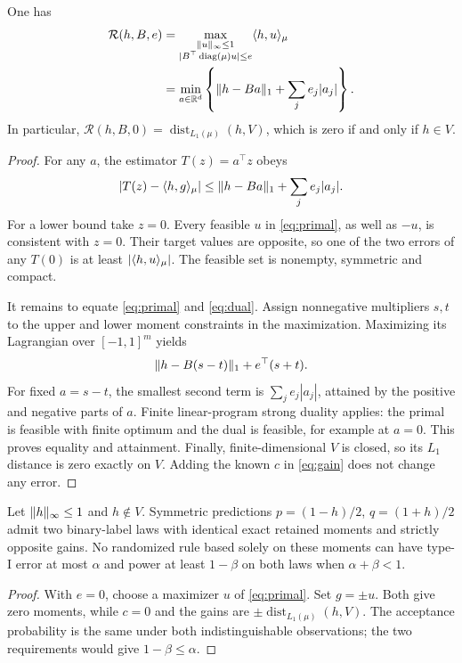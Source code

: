 \begin{theorem}\label{thm:ambiguity}
One has
\begin{align}
 \mathcal R(h,B,e)
 &=\max_{\substack{\lVert u\rVert_\infty\le1\\|B^\top\operatorname{diag}(\mu)u|\le e}}\langle h,u\rangle_\mu\label{eq:primal}\\
 &=\min_{a\in\mathbb R^d}\left\{\lVert h-Ba\rVert_1+\sum_j e_j|a_j|\right\}.
 \label{eq:dual}
\end{align}
In particular, $\mathcal R(h,B,0)=\operatorname{dist}_{L_1(\mu)}(h,V)$, which is zero if and only if $h\in V$.
\end{theorem}
\begin{proof}
For any $a$, the estimator $T(z)=a^\top z$ obeys
\[
 |T(z)-\langle h,g\rangle_\mu|
 \le\lVert h-Ba\rVert_1+\sum_j e_j|a_j|.
\]
For a lower bound take $z=0$. Every feasible $u$ in \eqref{eq:primal}, as well as $-u$, is consistent with $z=0$. Their target values are opposite, so one of the two errors of any $T(0)$ is at least $|\langle h,u\rangle_\mu|$. The feasible set is nonempty, symmetric and compact.

It remains to equate \eqref{eq:primal} and \eqref{eq:dual}. Assign nonnegative multipliers $s,t$ to the upper and lower moment constraints in the maximization. Maximizing its Lagrangian over $[-1,1]^m$ yields
\[
 \lVert h-B(s-t)\rVert_1+e^\top(s+t).
\]
For fixed $a=s-t$, the smallest second term is $\sum_j e_j|a_j|$, attained by the positive and negative parts of $a$. Finite linear-program strong duality applies: the primal is feasible with finite optimum and the dual is feasible, for example at $a=0$. This proves equality and attainment. Finally, finite-dimensional $V$ is closed, so its $L_1$ distance is zero exactly on $V$. Adding the known $c$ in \eqref{eq:gain} does not change any error.
\end{proof}

\begin{corollary}
Let $\lVert h\rVert_\infty\le1$ and $h\notin V$. Symmetric predictions
$p=(1-h)/2$, $q=(1+h)/2$ admit two binary-label laws with identical exact retained moments and strictly opposite gains. No randomized rule based solely on these moments can have type-I error at most $\alpha$ and power at least $1-\beta$ on both laws when $\alpha+\beta<1$.
\end{corollary}
\begin{proof}
With $e=0$, choose a maximizer $u$ of \eqref{eq:primal}. Set $g=\pm u$. Both give zero moments, while $c=0$ and the gains are
$\pm\operatorname{dist}_{L_1(\mu)}(h,V)$. The acceptance probability is the same under both indistinguishable observations; the two requirements would give $1-\beta\le\alpha$.
\end{proof}


